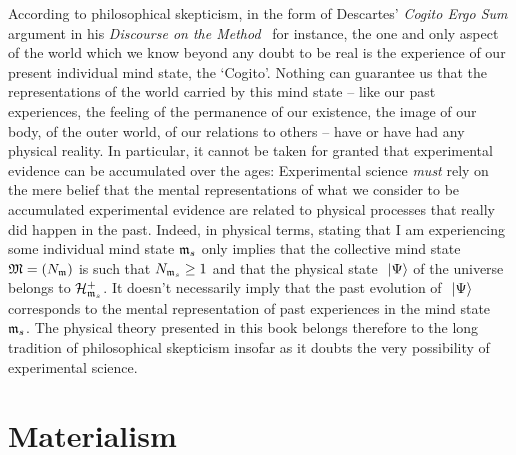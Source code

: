 \documentclass[10pt,a4paper,twoside,openany]{book}
\begin{document}
According to philosophical skepticism, in the form of Descartes' \textit{Cogito Ergo Sum} argument in his \textit{Discourse on the Method}~\cite{Descartes1637} for instance, the one and only aspect of the world which we know beyond any doubt to be real is the experience of our present individual mind state, the `Cogito'. Nothing can guarantee us that the representations of the world carried by this mind state -- like our past experiences, the feeling of the permanence of our existence, the image of our body, of the outer world, of our relations to others -- have or have had any physical reality. In particular, it cannot be taken for granted that experimental evidence can be accumulated over the ages: Experimental science \textit{must} rely on the mere belief that the mental representations of what we consider to be accumulated experimental evidence are related to physical processes that really did happen in the past. Indeed, in physical terms, stating that I am experiencing some individual mind state $\mathfrak{m}_s$ only implies that the collective mind state $\mathfrak{M} = ({N}_{\mathfrak{m}})$ is such that ${N}_{\mathfrak{m}_s} \geq 1$ and that the physical state $\ \left|{\Psi}\right\rangle$ of the universe belongs to $\mathcal H_{\mathfrak{m}_s}^+$. It doesn't necessarily imply that the past evolution of $\ \left|{\Psi}\right\rangle$ corresponds to the mental representation of past experiences in the mind state $\mathfrak{m}_s$. The physical theory presented in this book belongs therefore to the long tradition of philosophical skepticism insofar as it doubts the very possibility of experimental science.




\section{Materialism}
\end{document}
